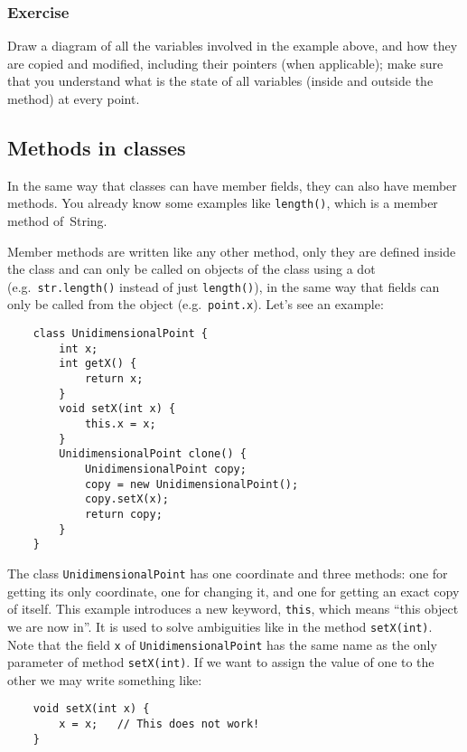 \subsubsection{Exercise}
\label{sec:exerciseff}

Draw a diagram of all the variables involved in the example above, 
and how they are copied and modified, including their pointers (when
applicable); 
make sure that you understand what is the state of all variables
(inside and outside the method) at every point. 

\subsection{Methods in classes}
\label{sec:methods-classes}

In the same way that classes can have member fields, they can also have
member methods. You already know some examples like \verb+length()+,
which is a member method of~String. 

Member methods are written like any other method, only they are
defined inside the class and can only be called on objects of the
class using a dot (e.g.~\verb+str.length()+ instead 
of just \verb+length()+), 
in the same way that fields can only
be called from the object (e.g.~\verb+point.x+). Let's see an example: 

\begin{verbatim}
    class UnidimensionalPoint {
        int x;
        int getX() {
            return x;
        }
        void setX(int x) {
            this.x = x;
        }
        UnidimensionalPoint clone() {
            UnidimensionalPoint copy;
            copy = new UnidimensionalPoint();
            copy.setX(x);
            return copy;
        }
    }
\end{verbatim}

The class \verb+UnidimensionalPoint+ has one coordinate and three
methods: one for getting its only coordinate, one for changing it, and
one for getting an exact copy of itself. This example introduces a new
keyword, \verb+this+, which means ``this object we are now in''. It is
used to solve ambiguities like in the method \verb+setX(int)+. Note
that the field \verb+x+ of \verb+UnidimensionalPoint+ has the same
name as the only parameter of method \verb+setX(int)+. If we want to
assign the value of one to the other we may write something like: 

\begin{verbatim}
    void setX(int x) {
        x = x;   // This does not work!
    }
\end{verbatim}

